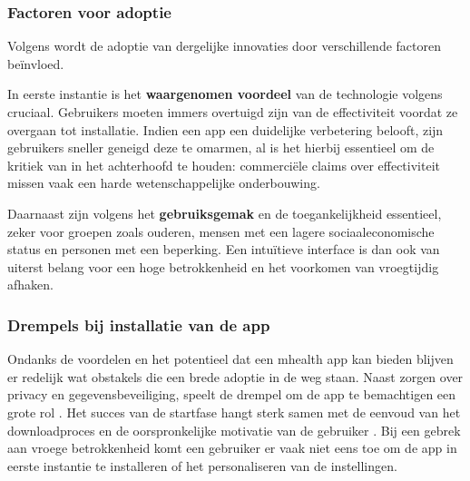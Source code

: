 \vspace{1em}

\subsubsection{Factoren voor adoptie}
\label{subsubsec:factoren-voor-adoptie}

\vspace{1em}

Volgens \textcite{Portz2024} wordt de adoptie van dergelijke innovaties door verschillende factoren beïnvloed. 

\vspace{1em}

In eerste instantie is het \textbf{waargenomen voordeel} van de technologie volgens \autocite{Portz2024} cruciaal. Gebruikers moeten immers overtuigd zijn van de effectiviteit voordat ze overgaan tot installatie. Indien een app een duidelijke verbetering belooft, zijn gebruikers sneller geneigd deze te omarmen, al is het hierbij essentieel om de kritiek van \textcite{Larsen2019} in het achterhoofd te houden: commerciële claims over effectiviteit missen vaak een harde wetenschappelijke onderbouwing. 

\vspace{1em}

Daarnaast zijn volgens \textcite{Portz2024} het \textbf{gebruiksgemak} en de toegankelijkheid essentieel, zeker voor groepen zoals ouderen, mensen met een lagere sociaaleconomische status en personen met een beperking. Een intuïtieve interface is dan ook van uiterst belang voor een hoge betrokkenheid en het voorkomen van vroegtijdig afhaken.

\vspace{1em}

\subsubsection{Drempels bij installatie van de app}
\label{subsubsec:drempels-bij-installatie-app}

\vspace{1em}

Ondanks de voordelen en het potentieel dat een \acrshort{mhealth} app kan bieden blijven er redelijk wat obstakels die een brede adoptie in de weg staan. Naast zorgen over privacy en gegevensbeveiliging, speelt de drempel om de app te bemachtigen een grote rol \autocite{Portz2024}. Het succes van de startfase hangt sterk samen met de eenvoud van het downloadproces en de oorspronkelijke motivatie van de gebruiker \autocite{Portz2024}. Bij een gebrek aan vroege betrokkenheid komt een gebruiker er vaak niet eens toe om de app in eerste instantie te installeren of het personaliseren van de instellingen.

